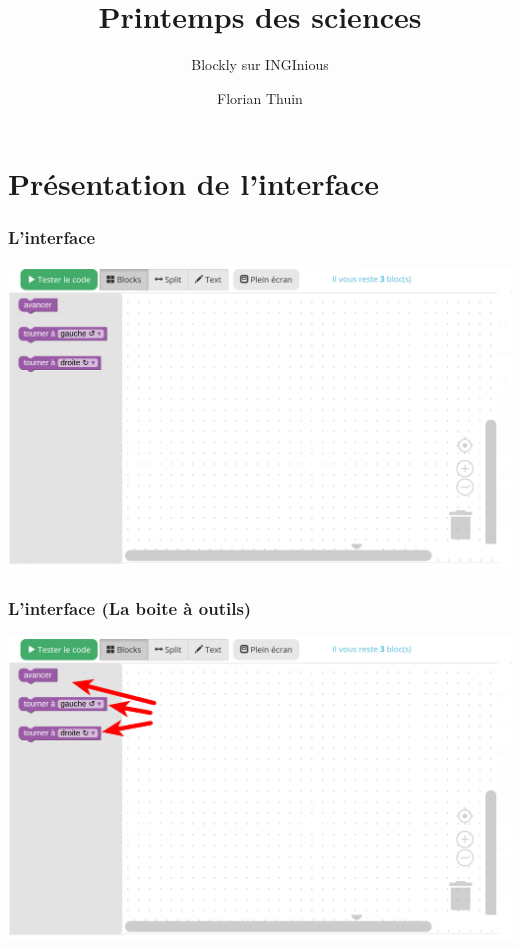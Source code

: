 \documentclass{beamer}
\title{Printemps des sciences}
\subtitle{Blockly sur INGInious}
\author{Florian Thuin}
\institute{Ecole Polytechnique de Louvain}
\begin{document}
\begin{frame}[plain]
	\titlepage
\end{frame}



\section{Présentation de l'interface}

\begin{frame}
	\frametitle{L'interface}

	\includegraphics[width=\linewidth]{interface.png}
\end{frame}

\begin{frame}
	\frametitle{L'interface (La boite à outils)}

	\includegraphics[width=\linewidth]{interface_toolbox.png}
\end{frame}
\end{document}
